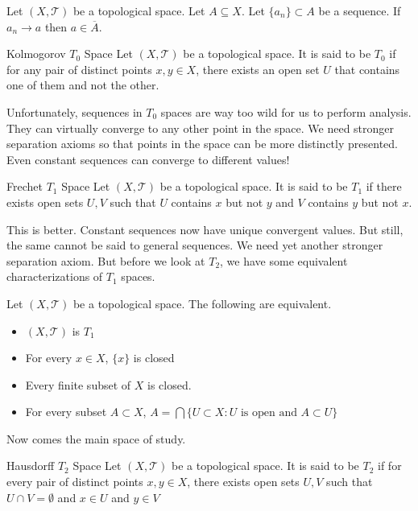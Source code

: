 \begin{prp}{}{} Let $(X,\mathcal{T})$ be a topological space. Let $A\subseteq X$. Let $\{a_n\}\subset A$ be a sequence. If $a_n\to a$ then $a\in\overline{A}$. 
\end{prp}

\begin{defn}{Kolmogorov $T_0$ Space}{} Let $(X,\mathcal{T})$ be a topological space. It is said to be $T_0$ if for any pair of distinct points $x,y\in X$, there exists an open set $U$ that contains one of them and not the other. 
\end{defn}

Unfortunately, sequences in $T_0$ spaces are way too wild for us to perform analysis. They can virtually converge to any other point in the space. We need stronger separation axioms so that points in the space can be more distinctly presented. Even constant sequences can converge to different values!

\begin{defn}{Frechet $T_1$ Space}{} Let $(X,\mathcal{T})$ be a topological space. It is said to be $T_1$ if there exists open sets $U,V$ such that $U$ contains $x$ but not $y$ and $V$ contains $y$ but not $x$. 
\end{defn}

This is better. Constant sequences now have unique convergent values. But still, the same cannot be said to general sequences. We need yet another stronger separation axiom. But before we look at $T_2$, we have some equivalent characterizations of $T_1$ spaces. 

\begin{prp}{}{} Let $(X,\mathcal{T})$ be a topological space. The following are equivalent. 
\begin{itemize}
\item $(X,\mathcal{T})$ is $T_1$
\item For every $x\in X$, $\{x\}$ is closed
\item Every finite subset of $X$ is closed. 
\item For every subset $A\subset X$, $A=\bigcap\{U\subset X:U\text{ is open and }A\subset U\}$
\end{itemize}
\end{prp}

Now comes the main space of study. 

\begin{defn}{Hausdorff $T_2$ Space}{} Let $(X,\mathcal{T})$ be a topological space. It is said to be $T_2$ if for every pair of distinct points $x,y\in X$, there exists open sets $U,V$ such that $U\cap V=\emptyset$ and $x\in U$ and $y\in V$
\end{defn}

